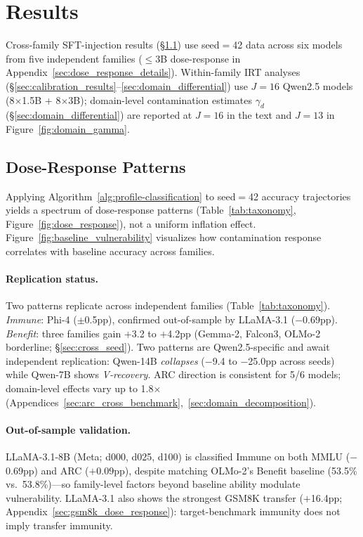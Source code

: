 \section{Results}
\label{sec:results}

Cross-family SFT-injection results (\S\ref{sec:taxonomy}) use seed$=$42 data across six models from five independent families ($\leq$3B dose-response in Appendix~\ref{sec:dose_response_details}). Within-family IRT analyses (\S\ref{sec:calibration_results}--\ref{sec:domain_differential}) use $J=16$ Qwen2.5 models (8$\times$1.5B + 8$\times$3B); domain-level contamination estimates $\gamma_d$ (\S\ref{sec:domain_differential}) are reported at $J=16$ in the text and $J=13$ in Figure~\ref{fig:domain_gamma}.

\subsection{Dose-Response Patterns}
\label{sec:taxonomy}

Applying Algorithm~\ref{alg:profile-classification} to seed$=$42 accuracy trajectories yields a spectrum of dose-response patterns (Table~\ref{tab:taxonomy}, Figure~\ref{fig:dose_response}), not a uniform inflation effect. Figure~\ref{fig:baseline_vulnerability} visualizes how contamination response correlates with baseline accuracy across families.

\paragraph{Replication status.}
Two patterns replicate across independent families (Table~\ref{tab:taxonomy}). \textit{Immune}: Phi-4 ($\pm$0.5pp), confirmed out-of-sample by LLaMA-3.1 ($-$0.69pp). \textit{Benefit}: three families gain $+$3.2 to $+$4.2pp (Gemma-2, Falcon3, OLMo-2 borderline; \S\ref{sec:cross_seed}). Two patterns are Qwen2.5-specific and await independent replication: Qwen-14B \textit{collapses} ($-$9.4 to $-$25.0pp across seeds) while Qwen-7B shows \textit{V-recovery}. ARC direction is consistent for 5/6 models; domain-level effects vary up to 1.8$\times$ (Appendices~\ref{sec:arc_cross_benchmark},~\ref{sec:domain_decomposition}).

\paragraph{Out-of-sample validation.}
LLaMA-3.1-8B (Meta; d000, d025, d100) is classified Immune on both MMLU ($-$0.69pp) and ARC ($+$0.09pp), despite matching OLMo-2's Benefit baseline (53.5\% vs.\ 53.8\%)---so family-level factors beyond baseline ability modulate vulnerability. LLaMA-3.1 also shows the strongest GSM8K transfer ($+$16.4pp; Appendix~\ref{sec:gsm8k_dose_response}): target-benchmark immunity does not imply transfer immunity.

